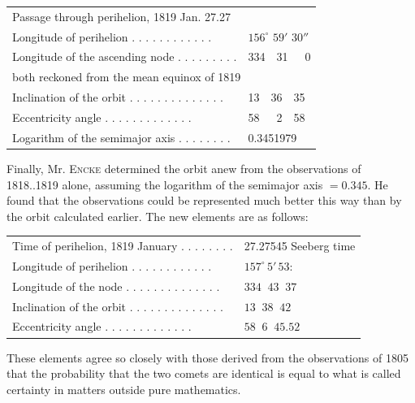 \begin{center}
\begin{tabular}{l l}
\multicolumn{2}{l}{Passage through perihelion, 1819 Jan. 27.27} \\
Longitude of perihelion . . . . . . . . . . . . & $156^\circ$ $59'$ $30''$ \\
Longitude of the ascending node . . . . . . . . . & 334\ \ 31\ \ \ 0 \\
\multicolumn{2}{l}{\quad both reckoned from the mean equinox of 1819} \\
Inclination of the orbit . . . . . . . . . . . . . . & 13\ \ 36\ \ 35 \\
Eccentricity angle . . . . . . . . . . . . . & 58\ \ \ 2\ \ 58 \\
Logarithm of the semimajor axis . . . . . . . . & 0.3451979 \\
\end{tabular}
\end{center}

\par\indent Finally, Mr. \textsc{Encke} determined the orbit anew from the observations of 1818..1819 alone, assuming the logarithm of the semimajor axis $= 0.345$. He found that the observations could be represented much better this way than by the orbit calculated earlier. The new elements are as follows:

\begin{center}
\begin{tabular}{l l}
Time of perihelion, 1819 January . . . . . . . . & 27.27545 Seeberg time \\
Longitude of perihelion . . . . . . . . . . . . & $157^\circ\,5'\,53$: \\ 
Longitude of the node . . . . . . . . . . . . . . & $334\;\;43\;\;37$ \\
Inclination of the orbit . . . . . . . . . . . . . . & $13\;\;38\;\;42$ \\
Eccentricity angle . . . . . . . . . . . . . & $58\;\;6\;\;45.52$ \\
\end{tabular}
\end{center}

\par\indent These elements agree so closely with those derived from the observations of 1805 that the probability that the two comets are identical is equal to what is called certainty in matters outside pure mathematics.

